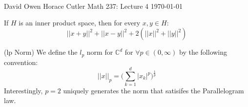 \documentclass[12pt]{article}
\newenvironment{theorem}[2][Theorem]{\begin{trivlist}
\item[\hskip \labelsep {\bfseries #1}\hskip \labelsep {\bfseries #2.}]}{\end{trivlist}}
\newenvironment{example}[1][Example]{\begin{trivlist}
\item[\hskip \labelsep {\bfseries #1:}]}{\end{trivlist}}
\begin{document}
\noindent David Owen Horace Cutler \hfill {\Large Math 237: Lecture 4} \hfill \today

\begin{theorem}{(Parallelogram Law)}
    If $H$ is an inner product space, then for every $x, y \in H$:
    \begin{equation}
        ||x + y||^2 + ||x - y||^2 + 2(||x||^2 + ||y||^2)
    \end{equation}
\end{theorem}

\begin{example}{(lp Norm)}
    We define the $l_p$ norm for $\mathbb{C}^d$ for $\forall p \in (0, \infty)$ by the following convention:
    \begin{equation}
        ||x||_p = \Big ( \sum_{k = 1}^d |x_k|^p \Big )^{\frac{1}{p}}
    \end{equation}
    Interestingly, $p = 2$ uniquely generates the norm that satisifes the Parallelogram law. 
\end{example}
\end{document}
